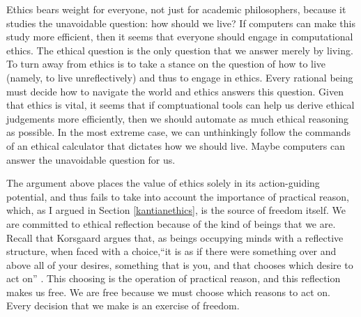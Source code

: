 \begin{isabellebody}
\begin{isamarkuptext}
Ethics bears weight for everyone, not just for academic philosophers, because it studies the unavoidable question:
how should we live? If computers can make this study more efficient, then it seems that everyone should
engage in computational ethics. The ethical question is the only question that 
we answer merely by living. To turn away from ethics is to take a stance on the question of how to 
live (namely, to live unreflectively) and thus to engage in ethics. Every rational being must decide 
how to navigate the world and ethics answers this question. Given that ethics is vital, it seems that if
comptuational tools can help us derive ethical judgements more efficiently, then we should automate as 
much ethical reasoning as possible.
In the most extreme case, we can unthinkingly follow the commands of an ethical calculator that dictates 
how we should live. Maybe computers can answer the unavoidable question for us.

The argument above places the value of ethics solely in its action-guiding potential, and thus fails to take into account the 
importance of practical reason, which, as I argued in Section \ref{kantianethics}, is the source
of freedom itself. We are committed to ethical reflection because of the kind of beings that we are. 
Recall that Korsgaard argues that, as beings occupying minds with a reflective structure, when faced with 
a choice,``it is as if there were something over and above all of your desires, something that is you, and that chooses which desire 
to act on'' \citep[83]{sources}. This choosing is the operation of practical reason, and this reflection
makes us free. We are free because we must choose which reasons to act on. Every decision that we 
make is an exercise of freedom. 


\end{isamarkuptext}
\end{isabellebody}
